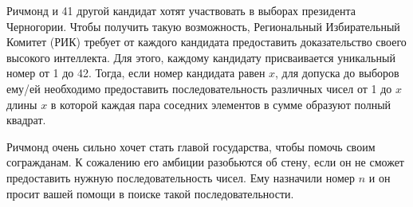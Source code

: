 Ричмонд и 41 другой кандидат хотят участвовать в выборах президента Черногории. Чтобы получить такую возможность, Региональный Избирательный Комитет (РИК) требует от каждого кандидата предоставить доказательство своего высокого интеллекта. Для этого, каждому кандидату присваивается уникальный номер от 1 до 42. Тогда, если номер кандидата равен $x$,  для допуска до выборов ему/ей необходимо предоставить последовательность различных чисел от 1 до $x$ длины $x$ в которой каждая пара соседних элементов в сумме образуют полный квадрат.

Ричмонд очень сильно хочет стать главой государства, чтобы помочь своим согражданам. К сожалению его амбиции разобьются об стену, если он не сможет предоставить нужную последовательность чисел. Ему назначили номер $n$ и он просит вашей помощи в поиске такой последовательности.
